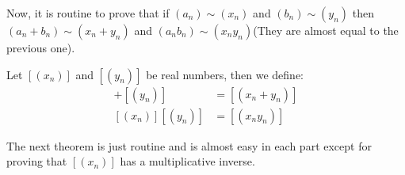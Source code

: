 \documentclass{tufte-handout}
\begin{document}
Now, it is routine to prove that if $(a_n) \sim (x_n)$ and $(b_n) \sim (y_n)$ then $(a_n + b_n) \sim (x_n + y_n)$ and $(a_nb_n) \sim (x_ny_n)$(They are almost equal to the previous one). 

\begin{definition}
	Let $[(x_n)]$ and $[(y_n)]$ be real numbers, then we define:
	\begin{align*}
		[(x_n)] + [(y_n)] &= [(x_n + y_n)]\\
		[(x_n)][(y_n)] &= [(x_ny_n)]
	\end{align*}
\end{definition}

The next theorem is just routine and is almost easy in each part except for proving that $[(x_n)]$ has a multiplicative inverse.
\end{document}
